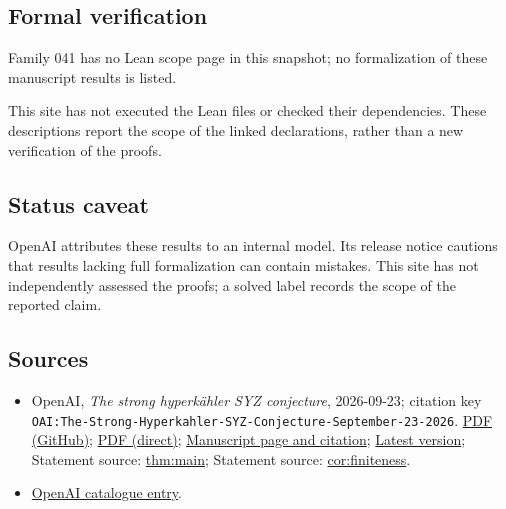 \documentclass[11pt]{article}
\begin{document}
\subsection{Formal verification}
Family 041 has no Lean scope page in this snapshot; no formalization of these manuscript results is listed.

This site has not executed the Lean files or checked their dependencies. These descriptions report the scope of the linked declarations, rather than a new verification of the proofs.

\subsection{Status caveat}
OpenAI attributes these results to an internal model. Its release notice cautions that results lacking full formalization can contain mistakes. This site has not independently assessed the proofs; a solved label records the scope of the reported claim.

\subsection{Sources}
\begin{itemize}
\item OpenAI, \emph{The strong hyperkähler SYZ conjecture}, 2026-09-23; citation key \texttt{OAI:The-Strong-Hyperkahler-SYZ-Conjecture-September-23-2026}. \href{https://github.com/openai/math/blob/adc7f1241b42e322a6451854ab7e4b4c146bf78a/preprints/The-Strong-Hyperkahler-SYZ-Conjecture-September-23-2026/main.pdf}{PDF (GitHub)}; \href{https://github.com/openai/math/raw/adc7f1241b42e322a6451854ab7e4b4c146bf78a/preprints/The-Strong-Hyperkahler-SYZ-Conjecture-September-23-2026/main.pdf}{PDF (direct)}; \href{https://github.com/openai/math/blob/adc7f1241b42e322a6451854ab7e4b4c146bf78a/preprints/The-Strong-Hyperkahler-SYZ-Conjecture-September-23-2026/README.md}{Manuscript page and citation}; \href{https://github.com/openai/math/blob/main/preprints/The-Strong-Hyperkahler-SYZ-Conjecture-September-23-2026/main.pdf}{Latest version}; Statement source: \href{https://github.com/openai/math/blob/adc7f1241b42e322a6451854ab7e4b4c146bf78a/preprints/The-Strong-Hyperkahler-SYZ-Conjecture-September-23-2026/build/sections/introduction.tex\#L25}{thm:main}; Statement source: \href{https://github.com/openai/math/blob/adc7f1241b42e322a6451854ab7e4b4c146bf78a/preprints/The-Strong-Hyperkahler-SYZ-Conjecture-September-23-2026/build/sections/introduction.tex\#L57}{cor:finiteness}.
\item \href{https://github.com/openai/math/blob/adc7f1241b42e322a6451854ab7e4b4c146bf78a/CONTENTS.md}{OpenAI catalogue entry}.
\end{itemize}
\end{document}
